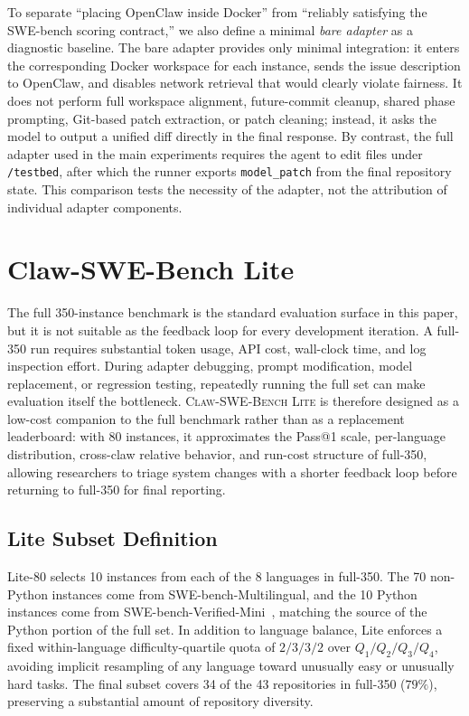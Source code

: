 \documentclass{llmxive}
\begin{document}
To separate ``placing OpenClaw inside Docker'' from ``reliably satisfying the SWE-bench scoring contract,'' we also define a minimal \emph{bare adapter} as a diagnostic baseline. The bare adapter provides only minimal integration: it enters the corresponding Docker workspace for each instance, sends the issue description to OpenClaw, and disables network retrieval that would clearly violate fairness. It does not perform full workspace alignment, future-commit cleanup, shared phase prompting, Git-based patch extraction, or patch cleaning; instead, it asks the model to output a unified diff directly in the final response. By contrast, the full adapter used in the main experiments requires the agent to edit files under \texttt{/testbed}, after which the runner exports \texttt{model\_patch} from the final repository state. This comparison tests the necessity of the adapter, not the attribution of individual adapter components.

\section{Claw-SWE-Bench Lite}
\label{sec:lite}

The full 350-instance benchmark is the standard evaluation surface in this paper, but it is not suitable as the feedback loop for every development iteration. A full-350 run requires substantial token usage, API cost, wall-clock time, and log inspection effort. During adapter debugging, prompt modification, model replacement, or regression testing, repeatedly running the full set can make evaluation itself the bottleneck. \textsc{Claw-SWE-Bench Lite} is therefore designed as a low-cost companion to the full benchmark rather than as a replacement leaderboard: with 80 instances, it approximates the Pass@1 scale, per-language distribution, cross-claw relative behavior, and run-cost structure of full-350, allowing researchers to triage system changes with a shorter feedback loop before returning to full-350 for final reporting.

\subsection{Lite Subset Definition}
\label{sec:lite-def}

Lite-80 selects 10 instances from each of the 8 languages in full-350. The 70 non-Python instances come from SWE-bench-Multilingual, and the 10 Python instances come from SWE-bench-Verified-Mini~\cite{swebench_verified_mini}, matching the source of the Python portion of the full set. In addition to language balance, Lite enforces a fixed within-language difficulty-quartile quota of $2/3/3/2$ over $Q_1/Q_2/Q_3/Q_4$, avoiding implicit resampling of any language toward unusually easy or unusually hard tasks. The final subset covers 34 of the 43 repositories in full-350 ($79\%$), preserving a substantial amount of repository diversity.
\end{document}
